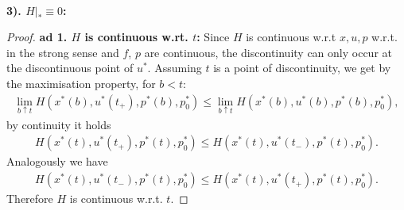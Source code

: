 \quad\\
\textbf{3). $H|_* \equiv 0$:}
\begin{proof}
\textbf{ad 1. $H$ is continuous w.rt. $t$:} Since $H$ is continuous w.r.t $x, u, p$ w.r.t. in the strong sense and $f$, $p$ are continuous, the discontinuity can only occur at the discontinuous point of $u^*$. Assuming $t$ is a point of discontinuity, we get by the maximisation property, for $b < t$:
\begin{align*}
	\lim_{b \uparrow t} H(x^*(b), u^*(t_+), p^*(b), p_0^*) \le \lim_{b \uparrow t}H(x^*(b), u^*(b), p^*(b), p_0^*), 
\end{align*}
by continuity it holds
\begin{align*}
	H(x^*(t), u^*(t_+), p^*(t), p_0^*) \le H(x^*(t), u^*(t_-), p^*(t), p_0^*).
\end{align*}
Analogously we have
\begin{align*}
	H(x^*(t), u^*(t_-), p^*(t), p_0^*) \le H(x^*(t), u^*(t_+), p^*(t), p_0^*).
\end{align*}
Therefore $H$ is continuous w.r.t. $t$.


\end{proof}
